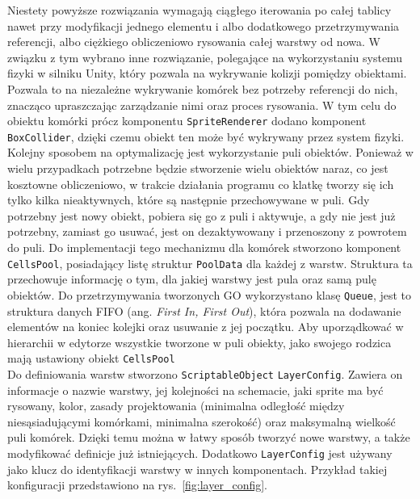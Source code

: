 Niestety powyższe rozwiązania wymagają ciągłego iterowania po całej tablicy nawet przy modyfikacji jednego elementu
i albo dodatkowego przetrzymywania referencji, albo ciężkiego obliczeniowo rysowania całej warstwy od nowa.
W związku z tym wybrano inne rozwiązanie, polegające na wykorzystaniu systemu fizyki w silniku Unity,
który pozwala na wykrywanie kolizji pomiędzy obiektami.
Pozwala to na niezależne wykrywanie komórek bez potrzeby referencji do nich,
znacząco upraszczając zarządzanie nimi oraz proces rysowania.
W tym celu do obiektu komórki prócz komponentu \texttt{SpriteRenderer} dodano komponent \texttt{BoxCollider},
dzięki czemu obiekt ten może być wykrywany przez system fizyki.\\
\indent Kolejny sposobem na optymalizację jest wykorzystanie puli obiektów.
Ponieważ w wielu przypadkach potrzebne będzie stworzenie wielu obiektów naraz, co jest kosztowne obliczeniowo,
w trakcie działania programu co klatkę tworzy się ich tylko kilka nieaktywnych, które są następnie przechowywane w puli.
Gdy potrzebny jest nowy obiekt, pobiera się go z puli i aktywuje, a gdy nie jest już potrzebny,
zamiast go usuwać, jest on dezaktywowany i przenoszony z powrotem do puli.
Do implementacji tego mechanizmu dla komórek stworzono komponent \texttt{CellsPool},
posiadający listę struktur \texttt{PoolData} dla każdej z warstw.
Struktura ta przechowuje informację o tym, dla jakiej warstwy jest pula oraz samą pulę obiektów.
Do przetrzymywania tworzonych GO wykorzystano klasę \texttt{Queue},
jest to struktura danych FIFO (ang. \textit{First In, First Out}),
która pozwala na dodawanie elementów na koniec kolejki oraz usuwanie z jej początku.
Aby uporządkować w hierarchii w edytorze wszystkie tworzone w puli obiekty,
jako swojego rodzica mają ustawiony obiekt \texttt{CellsPool}\\
\indent Do definiowania warstw stworzono \texttt{ScriptableObject} \texttt{LayerConfig}.
Zawiera on informacje o nazwie warstwy, jej kolejności na schemacie, jaki sprite ma być rysowany, kolor,
zasady projektowania (minimalna odległość między niesąsiadującymi komórkami, minimalna szerokość)
oraz maksymalną wielkość puli komórek.
Dzięki temu można w łatwy sposób tworzyć nowe warstwy, a także modyfikować definicje już istniejących.
Dodatkowo \texttt{LayerConfig} jest używany jako klucz do identyfikacji warstwy w innych komponentach.
Przykład takiej konfiguracji przedstawiono na rys.~\ref{fig:layer_config}.

